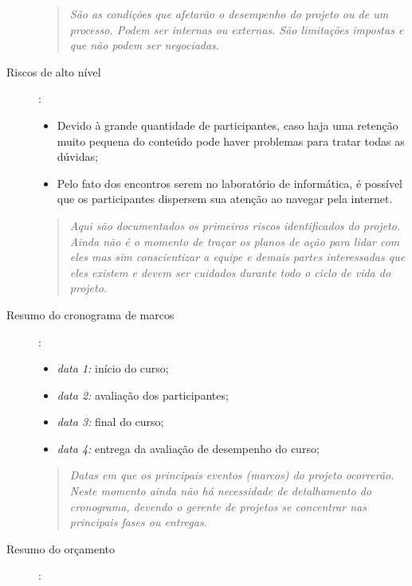 \begin{description}
	\begin{quote}
		\emph{São as condições que afetarão o desempenho do projeto ou de um processo. Podem ser internas ou externas. São limitações impostas e que não podem ser negociadas.}
	\end{quote}

	\item[Riscos de alto nível]:
	
	\begin{itemize}
		\item Devido à grande quantidade de participantes, caso haja uma retenção muito pequena do conteúdo pode haver problemas para tratar todas as dúvidas;
		\item Pelo fato dos encontros serem no laboratório de informática, é possível que os participantes dispersem sua atenção ao navegar pela internet.
	\end{itemize}

	\begin{quote}
		\emph{Aqui são documentados os primeiros riscos identificados do projeto. Ainda não é o momento de traçar os planos de ação para lidar com eles mas sim conscientizar a equipe e demais partes interessadas que eles existem e devem ser cuidados durante todo o ciclo de vida do projeto.}
	\end{quote}

	\item[Resumo do cronograma de marcos]:
	
		\begin{itemize}
			\item \textit{data 1:} início do curso;
			\item \textit{data 2:} avaliação dos participantes;
			\item \textit{data 3:} final do curso;
			\item \textit{data 4:} entrega da avaliação de desempenho do curso;
		\end{itemize}

	\begin{quote}
		\emph{Datas em que os principais eventos (marcos) do projeto ocorrerão. Neste momento ainda não há necessidade de detalhamento do cronograma, devendo o gerente de projetos se concentrar nas principais fases ou entregas.}
	\end{quote}

	\item[Resumo do orçamento]:
	
		\begin{table}[h!]
			\centering
			\begin{tabular}
				{
					|l|r|
				}
				

\end{tabular}
\end{table}
\end{description}
